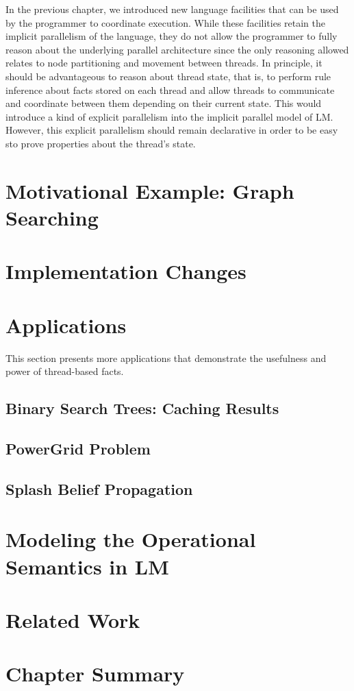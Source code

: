 In the previous chapter, we introduced new language facilities that can be used
by the programmer to coordinate execution. While these facilities retain the
implicit parallelism of the language, they do not allow the programmer to fully
reason about the underlying parallel architecture since the only reasoning
allowed relates to node partitioning and movement between threads. In principle,
it should be advantageous to reason about thread state, that is, to perform rule
inference about facts stored on each thread and allow threads to communicate and
coordinate between them depending on their current state. This would introduce a
kind of explicit parallelism into the implicit parallel model of LM.
However, this explicit parallelism should remain declarative in order to be easy
sto prove properties about the thread's state.

\section{Motivational Example: Graph Searching}


\section{Implementation Changes}


\section{Applications}

This section presents more applications that demonstrate the usefulness and
power of thread-based facts.

\subsection{Binary Search Trees: Caching Results}


\subsection{PowerGrid Problem}


\subsection{Splash Belief Propagation}\label{sec:coordination:bp}


\section{Modeling the Operational Semantics in LM}


\section{Related Work}


\section{Chapter Summary}

